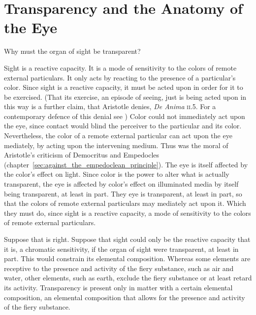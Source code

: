 
\section{Transparency and the Anatomy of the Eye} %
\label{sec:transparency_and_the_anatomy_of_the_eye}

Why must the organ of sight be transparent?

Sight is a reactive capacity. It is a mode of sensitivity to the colors of remote external particulars. It only acts by reacting to the presence of a particular's color. Since sight is a reactive capacity, it must be acted upon in order for it to be exercised. (That its exercise, an episode of seeing, just is being acted upon in this way is a further claim, that Aristotle denies, \emph{De Anima} \textsc{ii}.5. For a contemporary defence of this denial see \citealt{Travis:2009fk}) Color could not immediately act upon the eye, since contact would blind the perceiver to the particular and its color. Nevertheless, the color of a remote external particular can act upon the eye mediately, by acting upon the intervening medium. Thus was the moral of Aristotle's criticism of Democritus and Empedocles (chapter~\ref{sec:against_the_empedoclean_principle}). The eye is itself affected by the color's effect on light. Since color is the power to alter what is actually transparent, the eye is affected by color's effect on illuminated media by itself being transparent, at least in part. They eye is transparent, at least in part, so that the colors of remote external particulars may mediately act upon it. Which they must do, since sight is a reactive capacity, a mode of sensitivity to the colors of remote external particulars.

Suppose that is right. Suppose that sight could only be the reactive capacity that it is, a chromatic sensitivity, if the organ of sight were transparent, at least in part. This would constrain its elemental composition. Whereas some elements are receptive to the presence and activity of the fiery substance, such as air and water, other elements, such as earth, exclude the fiery substance or at least retard its activity. Transparency is present only in matter with a certain elemental composition, an elemental composition that allows for the presence and activity of the fiery substance.

